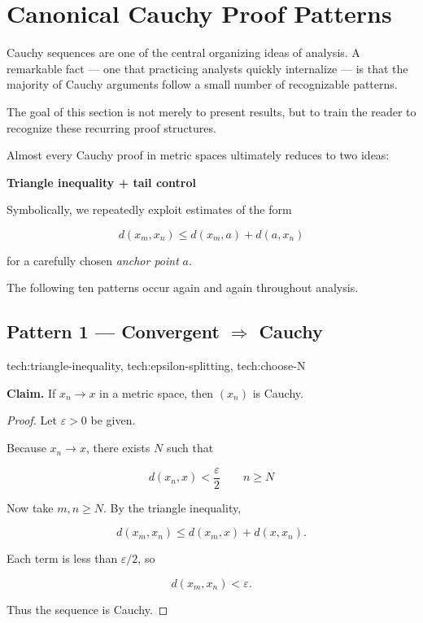 
\section{Canonical Cauchy Proof Patterns}

Cauchy sequences are one of the central organizing ideas of analysis.
A remarkable fact --- one that practicing analysts quickly internalize ---
is that the majority of Cauchy arguments follow a small number of
recognizable patterns.

The goal of this section is not merely to present results, but to train
the reader to recognize these recurring proof structures.

Almost every Cauchy proof in metric spaces ultimately reduces to two ideas:

\begin{center}
\textbf{Triangle inequality + tail control}
\end{center}

Symbolically, we repeatedly exploit estimates of the form

\[
d(x_m,x_n)
\le d(x_m,a)+d(a,x_n)
\]

for a carefully chosen \emph{anchor point} \(a\).

\bigskip

The following ten patterns occur again and again throughout analysis.

\subsection*{Pattern 1 — Convergent $\Rightarrow$ Cauchy}

\begin{remark*}[Techniques]
tech:triangle-inequality, tech:epsilon-splitting, tech:choose-N
\end{remark*}

\textbf{Claim.}
If \(x_n \to x\) in a metric space, then \((x_n)\) is Cauchy.

\begin{proof}

Let \(\varepsilon>0\) be given.

Because \(x_n\to x\), there exists \(N\) such that

\[
d(x_n,x) < \frac{\varepsilon}{2}
\qquad n\ge N
\]

Now take \(m,n\ge N\). By the triangle inequality,

\[
d(x_m,x_n)
\le d(x_m,x) + d(x,x_n).
\]

Each term is less than \(\varepsilon/2\), so

\[
d(x_m,x_n) < \varepsilon.
\]

Thus the sequence is Cauchy.
\end{proof}

